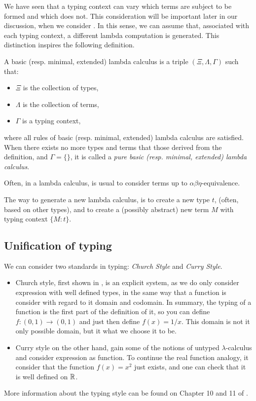 We have seen that a typing context can vary which terms are subject to be formed and which does not. This consideration will be important later in our discussion, when we consider . In this sense, we can assume that, associated with each typing context, a different lambda computation is generated. This distinction inspires the following definition.


\begin{definition}
  A basic (resp. minimal, extended) lambda calculus is a triple $(\Xi, \Lambda, \Gamma)$ such that:
  \begin{itemize}
  \item $\Xi$ is the collection of types,
  \item $\Lambda$ is the collection of terms,
  \item $\Gamma$ is a typing context,
  \end{itemize}
  where all rules of basic (resp. minimal, extended) lambda calculus are satisfied. When there
  exists no more types and terms that those derived from the definition, and $\Gamma=\{\}$, it is called a \emph{pure basic (resp. minimal, extended) lambda calculus}.   
\end{definition}
\begin{remark}
  Often, in a lambda calculus, is usual to consider terms up to $\alpha\beta\eta$-equivalence. 
\end{remark}

The way to generate a new lambda calculus, is to create a new type $t$, (often, based on other types), and to create a (possibly abstract) new term $M$ with typing context $\{M:t\}$.
\subsection{Unification of typing}

We can consider two standards in typing: \emph{Church Style} and \emph{Curry Style}.
\begin{itemize}
\item Church style,  first shown in \cite{church1940formulation}, is an explicit system, as we do only consider expression with well defined types, in the same way that a function is consider with regard to it domain and codomain. In summary, the typing of a function is the first part of the definition of it, so you can define $f:(0,1)\to (0,1)$ and just then define $f(x)=1/x$. This domain is not it only possible domain, but it what we choose it to be. 
\item Curry style on the other hand, gain some of the notions of untyped $\lambda$-calculus and consider expression as function. To continue the real function analogy, it consider that the function $f(x)=x^2$ just exists, and one can check that it is well defined on $\mathbb{R}$. \\
\end{itemize}
More information about the typing style can be found on Chapter 10 and 11 of \cite{hindley2008lambda}. \\

